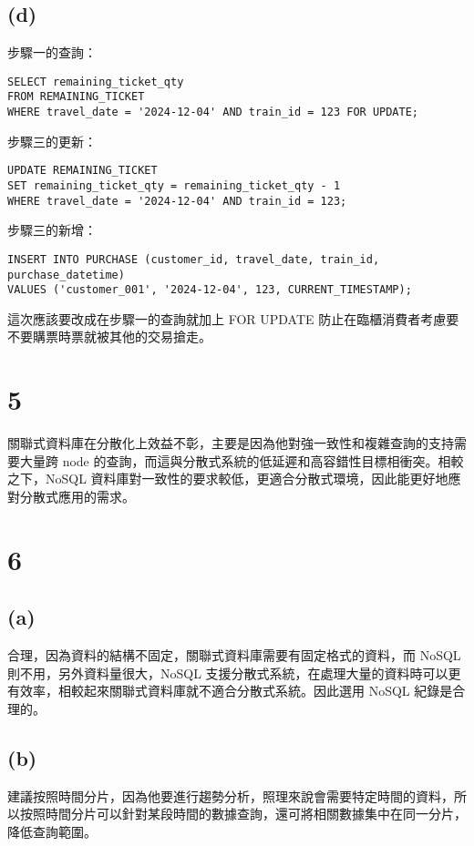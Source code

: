 \documentclass{article}
\begin{document}
\subsection*{(d)}
\noindent 步驟一的查詢：
\begin{verbatim}
SELECT remaining_ticket_qty 
FROM REMAINING_TICKET 
WHERE travel_date = '2024-12-04' AND train_id = 123 FOR UPDATE;
\end{verbatim}
步驟三的更新：
\begin{verbatim}
UPDATE REMAINING_TICKET 
SET remaining_ticket_qty = remaining_ticket_qty - 1 
WHERE travel_date = '2024-12-04' AND train_id = 123;
\end{verbatim}
步驟三的新增：
\begin{verbatim}
INSERT INTO PURCHASE (customer_id, travel_date, train_id, purchase_datetime) 
VALUES ('customer_001', '2024-12-04', 123, CURRENT_TIMESTAMP);
\end{verbatim}
這次應該要改成在步驟一的查詢就加上 FOR UPDATE 防止在臨櫃消費者考慮要不要購票時票就被其他的交易搶走。



\section*{5}
關聯式資料庫在分散化上效益不彰，主要是因為他對強一致性和複雜查詢的支持需要大量跨 node 的查詢，而這與分散式系統的低延遲和高容錯性目標相衝突。相較之下，NoSQL 資料庫對一致性的要求較低，更適合分散式環境，因此能更好地應對分散式應用的需求。


\section*{6}
\subsection*{(a)}
合理，因為資料的結構不固定，關聯式資料庫需要有固定格式的資料，而 NoSQL 則不用，另外資料量很大，NoSQL 支援分散式系統，在處理大量的資料時可以更有效率，相較起來關聯式資料庫就不適合分散式系統。因此選用 NoSQL 紀錄是合理的。

\subsection*{(b)}
建議按照時間分片，因為他要進行趨勢分析，照理來說會需要特定時間的資料，所以按照時間分片可以針對某段時間的數據查詢，還可將相關數據集中在同一分片，降低查詢範圍。
\end{document}
